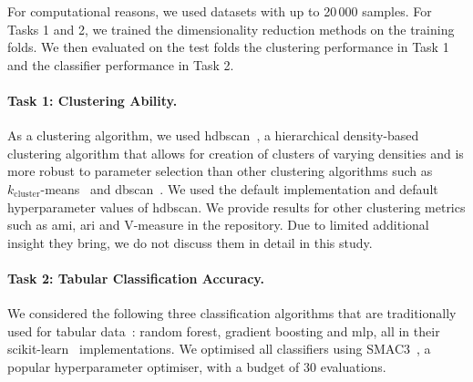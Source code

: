 For computational reasons, we used datasets with up to 20\,000 samples.
For Tasks 1 and 2, we trained the dimensionality reduction methods on the training folds.
We then evaluated on the test folds the clustering performance in Task 1 and the classifier performance in Task 2.

\paragraph*{Task 1: Clustering Ability.}
As a clustering algorithm, we used \gls{hdbscan}~\citep{CamEtAl13}, a hierarchical density-based clustering algorithm that allows for creation of clusters of varying densities and is more robust to parameter selection than other clustering algorithms such as $k_{\mathrm{cluster}}$-means~\citep{KanEtAl02} and \gls{dbscan}~\citep{EstEtAl96}.
We used the default implementation and default hyperparameter values of \gls{hdbscan}.
We provide results for other clustering metrics such as \gls{ami}, \gls{ari} and V-measure in the repository.
Due to limited additional insight they bring, we do not discuss them in detail in this study.
\paragraph*{Task 2: Tabular Classification Accuracy.}
We considered the following three classification algorithms that are traditionally used for tabular data~\citep{GriEtAl22}: random forest, gradient boosting and \gls{mlp}, all in their scikit-learn~\citep{PedEtAl11} implementations.
We optimised all classifiers using SMAC3~\citep{LinEtAl22b}, a popular hyperparameter optimiser, with a budget of 30 evaluations.



